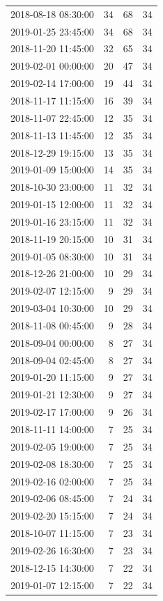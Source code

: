 \begin{tabular}{lrrr}
2018-08-18 08:30:00 & 34 & 68 & 34 \\
2019-01-25 23:45:00 & 34 & 68 & 34 \\
2018-11-20 11:45:00 & 32 & 65 & 34 \\
2019-02-01 00:00:00 & 20 & 47 & 34 \\
2019-02-14 17:00:00 & 19 & 44 & 34 \\
2018-11-17 11:15:00 & 16 & 39 & 34 \\
2018-11-07 22:45:00 & 12 & 35 & 34 \\
2018-11-13 11:45:00 & 12 & 35 & 34 \\
2018-12-29 19:15:00 & 13 & 35 & 34 \\
2019-01-09 15:00:00 & 14 & 35 & 34 \\
2018-10-30 23:00:00 & 11 & 32 & 34 \\
2019-01-15 12:00:00 & 11 & 32 & 34 \\
2019-01-16 23:15:00 & 11 & 32 & 34 \\
2018-11-19 20:15:00 & 10 & 31 & 34 \\
2019-01-05 08:30:00 & 10 & 31 & 34 \\
2018-12-26 21:00:00 & 10 & 29 & 34 \\
2019-02-07 12:15:00 & 9 & 29 & 34 \\
2019-03-04 10:30:00 & 10 & 29 & 34 \\
2018-11-08 00:45:00 & 9 & 28 & 34 \\
2018-09-04 00:00:00 & 8 & 27 & 34 \\
2018-09-04 02:45:00 & 8 & 27 & 34 \\
2019-01-20 11:15:00 & 9 & 27 & 34 \\
2019-01-21 12:30:00 & 9 & 27 & 34 \\
2019-02-17 17:00:00 & 9 & 26 & 34 \\
2018-11-11 14:00:00 & 7 & 25 & 34 \\
2019-02-05 19:00:00 & 7 & 25 & 34 \\
2019-02-08 18:30:00 & 7 & 25 & 34 \\
2019-02-16 02:00:00 & 7 & 25 & 34 \\
2019-02-06 08:45:00 & 7 & 24 & 34 \\
2019-02-20 15:15:00 & 7 & 24 & 34 \\
2018-10-07 11:15:00 & 7 & 23 & 34 \\
2019-02-26 16:30:00 & 7 & 23 & 34 \\
2018-12-15 14:30:00 & 7 & 22 & 34 \\
2019-01-07 12:15:00 & 7 & 22 & 34 \\

\end{tabular}
